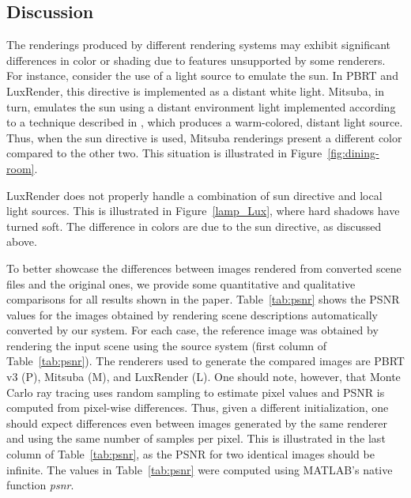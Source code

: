 \subsection{Discussion}
\label{subsec:discussion}

The renderings produced by different rendering systems may exhibit significant differences in color or shading due to features unsupported by some renderers.  
For instance, consider the use of a light source to emulate the sun. In PBRT and LuxRender, this directive is implemented as a distant white light.
Mitsuba, in turn, emulates the sun using a distant environment light implemented according to a technique 
described in \cite{Preetham}, which produces a warm-colored, distant light source. Thus, when the sun directive is used, Mitsuba renderings present a different color compared to the other two. This situation is illustrated in Figure~\ref{fig:dining-room}.

LuxRender does not properly handle a combination of sun directive and local light sources. This is illustrated in Figure~\ref{lamp_Lux}, where hard shadows have turned soft. The difference in colors are due to the sun directive, as discussed above.

	To better showcase the differences between images rendered from converted scene files and the original ones, we provide some quantitative and qualitative comparisons for all results shown in the paper.
	Table~\ref{tab:psnr} shows the PSNR values for the images obtained by rendering scene descriptions automatically converted by our system. For each case, the reference image was obtained by rendering the input scene using the source system (first column of Table~\ref{tab:psnr}). The renderers used to generate the compared images  
	are PBRT v3 (P), Mitsuba (M), and LuxRender (L). 
	One should note, however, 
	that Monte Carlo ray tracing uses random sampling to estimate pixel values and PSNR is computed from 
	pixel-wise differences. Thus, given a different initialization, one should expect differences even between images generated by the same renderer and using the same number of samples per pixel. This is illustrated in the last column of Table~\ref{tab:psnr}, as the PSNR for two identical images should be infinite. 
	The values in Table~\ref{tab:psnr} were computed using MATLAB's native function \emph{psnr}. 
	
